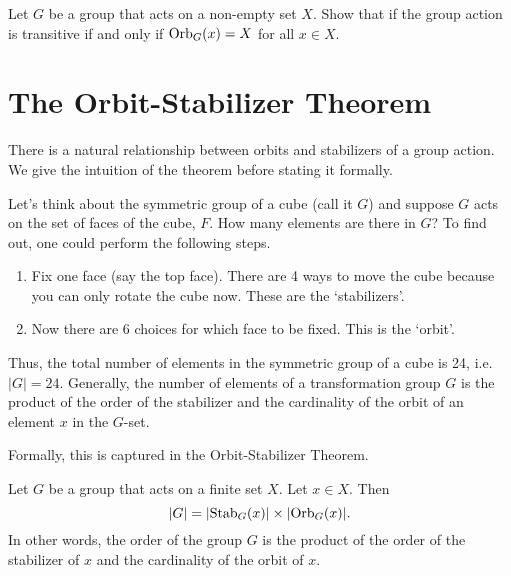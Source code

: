 \begin{exercise}\label{exercise-group-action-transitive-iff-all-orbits-is-whole-set}
    Let $G$ be a group that acts on a non-empty set $X$. Show that if the group action is transitive if and only if $\mathrm{Orb}_{G}(x) = X$ for all $x \in X$.
\end{exercise}

\section{The Orbit-Stabilizer Theorem}
There is a natural relationship between orbits and stabilizers of a group action. We give the intuition of the theorem before stating it formally.

Let's think about the symmetric group of a cube (call it $G$) and suppose $G$ acts on the set of faces of the cube, $F$. How many elements are there in $G$? To find out, one could perform the following steps.
\begin{enumerate}
    \item Fix one face (say the top face). There are 4 ways to move the cube because you can only rotate the cube now. These are the `stabilizers'.
    \item Now there are 6 choices for which face to be fixed. This is the `orbit'.
\end{enumerate}
Thus, the total number of elements in the symmetric group of a cube is 24, i.e. $|G| = 24$. Generally, the number of elements of a transformation group $G$ is the product of the order of the stabilizer and the cardinality of the orbit of an element $x$ in the $G$-set.

Formally, this is captured in the Orbit-Stabilizer Theorem.
\begin{theorem}\label{thrm-orbit-stabilizer}
    Let $G$ be a group that acts on a finite set $X$. Let $x \in X$. Then
    \[
        |G| = |\mathrm{Stab}_{G}(x)| \times |\mathrm{Orb}_{G}(x)|.
    \]
    In other words, the order of the group $G$ is the product of the order of the stabilizer of $x$ and the cardinality of the orbit of $x$.
\end{theorem}

